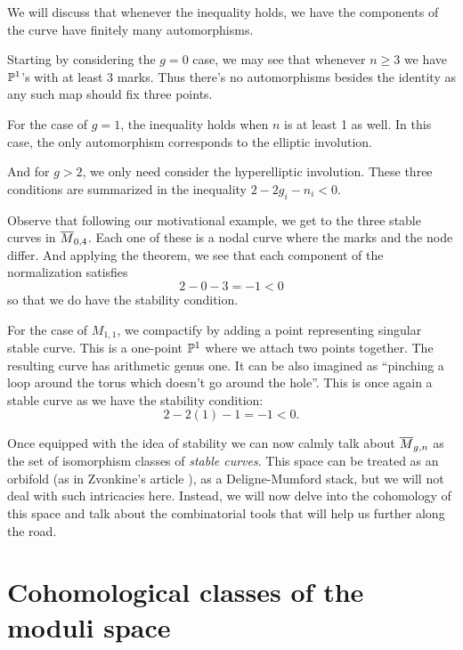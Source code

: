 \documentclass[12pt]{memoir}
\begin{document}
\begin{ptcb}
    We will discuss that whenever the inequality holds, we have the components of the curve have finitely many automorphisms.\par
    Starting by considering the $g=0$ case, we may see that whenever $n\geq 3$ we have $\mathbb{P}^1$'s with at least 3 marks. Thus there's no automorphisms besides the identity as any such map should fix three points.\par
    For the case of $g=1$, the inequality holds when $n$ is at least 1 as well. In this case, the only automorphism corresponds to the elliptic involution.\par
    And for $g>2$, we only need consider the hyperelliptic involution.
    These three conditions are summarized in the inequality $2-2g_i-n_i<0$.
\end{ptcb}
\begin{Ex}
    Observe that following our motivational example, we get to the three stable curves in $\overline M_{0,4}$. Each one of these is a nodal curve where the marks and the node differ. And applying the theorem, we see that each component of the normalization satisfies
    $$2-0-3=-1<0$$
    so that we do have the stability condition. 
\end{Ex}

\begin{Ex}\label{ex-Mg1n1-compactification}
    For the case of $M_{1,1}$, we compactify by adding a point representing singular stable curve. This is a one-point $\mathbb{P}^1$ where we attach two points together. The resulting curve has arithmetic genus one. It can be also imagined as ``pinching a loop around the torus which doesn't go around the hole''. This is once again a stable curve as we have the stability condition:
    $$2-2(1)-1=-1<0.$$
\end{Ex}

Once equipped with the idea of stability we can now calmly talk about $\overline M_{g,n}$ as the set of isomorphism classes of \emph{stable curves}. This space can be treated as an orbifold (as in Zvonkine's article \cite{ZvonkineIntro}), as a Deligne-Mumford stack, but we will not deal with such intricacies here. Instead, we will now delve into the cohomology of this space and talk about the combinatorial tools that will help us further along the road.

\section{Cohomological classes of the moduli space}
\end{document}
